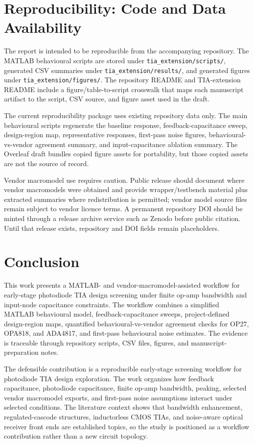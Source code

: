 \section{Reproducibility: Code and Data Availability}

The report is intended to be reproducible from the accompanying repository. The MATLAB behavioural scripts are stored under \texttt{tia\_extension/scripts/}, generated CSV summaries under \texttt{tia\_extension/results/}, and generated figures under \texttt{tia\_extension/figures/}. The repository README and TIA-extension README include a figure/table-to-script crosswalk that maps each manuscript artifact to the script, CSV source, and figure asset used in the draft.

The current reproducibility package uses existing repository data only. The main behavioural scripts regenerate the baseline response, feedback-capacitance sweep, design-region map, representative responses, first-pass noise figures, behavioural-vs-vendor agreement summary, and input-capacitance ablation summary. The Overleaf draft bundles copied figure assets for portability, but those copied assets are not the source of record.

Vendor macromodel use requires caution. Public release should document where vendor macromodels were obtained and provide wrapper/testbench material plus extracted summaries where redistribution is permitted; vendor model source files remain subject to vendor licence terms. A permanent repository DOI should be minted through a release archive service such as Zenodo before public citation. Until that release exists, repository and DOI fields remain placeholders.

\section{Conclusion}

This work presents a MATLAB- and vendor-macromodel-assisted workflow for early-stage photodiode TIA design screening under finite op-amp bandwidth and input-node capacitance constraints. The workflow combines a simplified MATLAB behavioural model, feedback-capacitance sweeps, project-defined design-region maps, quantified behavioural-vs-vendor agreement checks for OP27, OPA818, and ADA4817, and first-pass behavioural noise estimates. The evidence is traceable through repository scripts, CSV files, figures, and manuscript-preparation notes.

The defensible contribution is a reproducible early-stage screening workflow for photodiode TIA design exploration. The work organizes how feedback capacitance, photodiode capacitance, finite op-amp bandwidth, peaking, selected vendor macromodel exports, and first-pass noise assumptions interact under selected conditions. The literature context shows that bandwidth enhancement, regulated-cascode structures, inductorless CMOS TIAs, and noise-aware optical receiver front ends are established topics, so the study is positioned as a workflow contribution rather than a new circuit topology.

